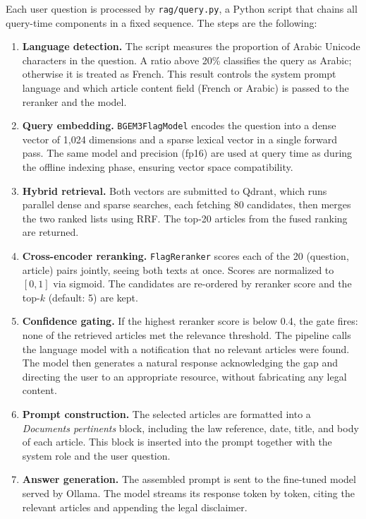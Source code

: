 Each user question is processed by \texttt{rag/query.py}, a Python script that chains all query-time components in a fixed sequence. The steps are the following:

\begin{enumerate}
    \item \textbf{Language detection.} The script measures the proportion of Arabic Unicode characters in the question. A ratio above 20\% classifies the query as Arabic; otherwise it is treated as French. This result controls the system prompt language and which article content field (French or Arabic) is passed to the reranker and the model.

    \item \textbf{Query embedding.} \texttt{BGEM3FlagModel} encodes the question into a dense vector of 1,024 dimensions and a sparse lexical vector in a single forward pass. The same model and precision (fp16) are used at query time as during the offline indexing phase, ensuring vector space compatibility.

    \item \textbf{Hybrid retrieval.} Both vectors are submitted to Qdrant, which runs parallel dense and sparse searches, each fetching 80 candidates, then merges the two ranked lists using \ac{RRF}. The top-20 articles from the fused ranking are returned.

    \item \textbf{Cross-encoder reranking.} \texttt{FlagReranker} scores each of the 20 (question, article) pairs jointly, seeing both texts at once. Scores are normalized to $[0, 1]$ via sigmoid. The candidates are re-ordered by reranker score and the top-$k$ (default: 5) are kept.

    \item \textbf{Confidence gating.} If the highest reranker score is below 0.4, the gate fires: none of the retrieved articles met the relevance threshold. The pipeline calls the language model with a notification that no relevant articles were found. The model then generates a natural response acknowledging the gap and directing the user to an appropriate resource, without fabricating any legal content.

    \item \textbf{Prompt construction.} The selected articles are formatted into a \textit{Documents pertinents} block, including the law reference, date, title, and body of each article. This block is inserted into the prompt together with the system role and the user question.

    \item \textbf{Answer generation.} The assembled prompt is sent to the fine-tuned model served by Ollama. The model streams its response token by token, citing the relevant articles and appending the legal disclaimer.
\end{enumerate}

